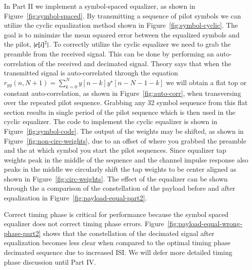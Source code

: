 In Part II we implement a symbol-spaced equalizer, as shown in Figure~\ref{fig:symbol-spaced}. By transmitting a sequence of pilot symbols we can utilize the cyclic equalization method shown in Figure~\ref{fig:symbol-cyclic}. The goal is to minimize the mean squared error between the equalized symbols and the pilot, $\lvert{e[i]}^2\rvert$. To correctly utilize the cyclic equalizer we need to grab the preamble from the received signal. This can be done by performing an auto-correlation of the received and decimated signal. Theory says that when the transmitted signal is auto-correlated through the equation $r_{yy}(n, N+1) = \sum_{k=0}^{N} y[n-k]y^{\star}[n-N-1-k]$ we will obtain a flat top or constant auto-correlation, as shown in Figure~\ref{fig:auto-corr}, when transversing over the repeated pilot sequence. Grabbing any 32 symbol sequence from this flat section results in single period of the pilot sequence which is then used in the cyclic equalizer. The code to implement the cyclic equalizer is shown in Figure~\ref{fig:symbol-code}. The output of the weights may be shifted, as shown in Figure~\ref{fig:non-circ-weights}, due to an offset of where you grabbed the preamble and the at which symbol you start the pilot sequences. Since equalizer tap weights peak in the middle of the sequence and the channel impulse response also peaks in the middle we circularly shift the tap weights to be center aligned as shown in Figure~\ref{fig:circ-weights}. The effect of the equalizer can be shown through the a comparison of the constellation of the payload before and after equalization in Figure~\ref{fig:payload-equal-part2}.

Correct timing phase is critical for performance because the symbol spaced equalizer does not correct timing phase errors. Figure~\ref{fig:payload-equal-wrong-phase-part2} shows that the constellation of the decimated signal after equalization becomes less clear when compared to the optimal timing phase decimated sequence due to increased ISI. We will defer more detailed timing phase discussion until Part IV.